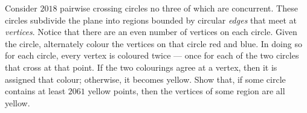 Consider $2018$ pairwise crossing circles no three of which are concurrent. These circles subdivide the plane into regions bounded by circular \emph{edges} that meet at \emph{vertices}. Notice that there are an even number of vertices on each circle. Given the circle, alternately colour the vertices on that circle red and blue. In doing so for each circle, every vertex is coloured twice --- once for each of the two circles that cross at that point. If the two colourings agree at a vertex, then it is assigned that colour; otherwise, it becomes yellow. Show that, if some circle contains at least $2061$ yellow points, then the vertices of some region are all yellow.
